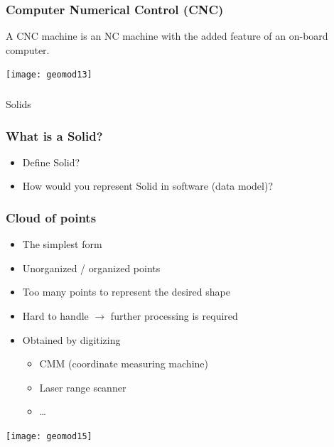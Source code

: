 \begin{frame}[fragile]\frametitle{Computer Numerical Control (CNC)}
A CNC machine is an NC machine with the added feature of an on-board computer.

			\begin{center}
	\texttt{[image: geomod13]}
			\end{center}
\end{frame}

\begin{frame}[fragile]\frametitle{}
\begin{center}
{\Large Solids}
\end{center}
\end{frame}

\begin{frame}[fragile]\frametitle{What is a Solid?}
\begin{itemize}
\item Define Solid?
\item How would you represent Solid in software (data model)?
\end{itemize}
\end{frame}

\begin{frame}[fragile]\frametitle{Cloud of points }
\begin{itemize}
\item The simplest form
\item Unorganized / organized points
\item Too many points to represent the desired shape
\item Hard to handle $\rightarrow$ further processing is required
\item Obtained by digitizing
\begin{itemize}
\item CMM (coordinate measuring machine)
\item Laser range scanner
\item \ldots
\end{itemize}
\end{itemize}

			\begin{center}
	\texttt{[image: geomod15]}
			\end{center}
\end{frame}

